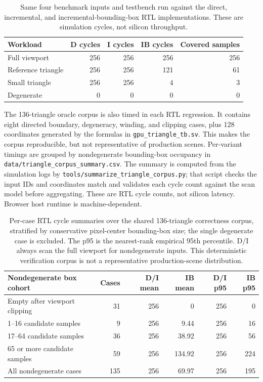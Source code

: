 \documentclass[10pt,a4paper]{article}
\begin{document}
\begin{table}[!htbp]
\centering
\small
\begin{tabular}{lrrrr}
\toprule
Workload & D cycles & I cycles & IB cycles & Covered samples\\
\midrule
Full viewport & 256 & 256 & 256 & 256\\
Reference triangle & 256 & 256 & 121 & 61\\
Small triangle & 256 & 256 & 4 & 3\\
Degenerate & 0 & 0 & 0 & 0\\
\bottomrule
\end{tabular}
\caption{Same four benchmark inputs and testbench run against the direct,
incremental, and incremental-bounding-box RTL implementations. These are
simulation cycles, not silicon throughput.}
\label{tab:three-arms-bench}
\end{table}

The 136-triangle oracle corpus is also timed in each RTL regression. It
contains eight directed boundary, degeneracy, winding, and clipping cases,
plus 128 coordinates generated by the formulas in
\texttt{gpu\_triangle\_tb.sv}. This makes the corpus reproducible, but not
representative of production scenes. Per-variant timings are grouped by
nondegenerate bounding-box occupancy in
\texttt{data/triangle\_corpus\_summary.csv}. The summary is computed from the
simulation logs by \texttt{tools/summarize\_triangle\_corpus.py}; that script
checks the input IDs and coordinates match and validates each cycle count
against the scan model before aggregating. These are RTL cycle counts, not
silicon latency. Browser host runtime is machine-dependent.

\begin{table}[!htbp]
\centering
\small
\begin{tabular}{lrrrrr}
\toprule
Nondegenerate box cohort & Cases & D/I mean & IB mean & D/I p95 & IB p95\\
\midrule
Empty after viewport clipping & 31 & 256 & 0 & 256 & 0\\
1--16 candidate samples & 9 & 256 & 9.44 & 256 & 16\\
17--64 candidate samples & 36 & 256 & 38.92 & 256 & 56\\
65 or more candidate samples & 59 & 256 & 134.92 & 256 & 224\\
All nondegenerate cases & 135 & 256 & 69.97 & 256 & 195\\
\bottomrule
\end{tabular}
\caption{Per-case RTL cycle summaries over the shared 136-triangle
correctness corpus, stratified by conservative pixel-center bounding-box
size; the single degenerate case is excluded. The p95 is the nearest-rank
empirical 95th percentile. D/I always scan the full viewport for
nondegenerate inputs. This deterministic verification corpus is not a
representative production-scene distribution.}
\label{tab:corpus-latency}
\end{table}
\end{document}
